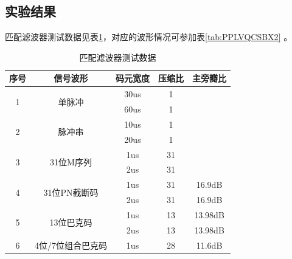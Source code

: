 \documentclass[12pt]{article}
\begin{document}
\subsection{实验结果}
匹配滤波器测试数据见表\ref{tab:addlabelPPLVQ}，对应的波形情况可参加表\ref{tab:PPLVQCSBX2}
。
\begin{table}[htbp]
  \centering
  \caption{匹配滤波器测试数据}
    \begin{tabular}{|c|c|c|c|c|}
    \hline
    序号 & 信号波形 & 码元宽度 & 压缩比 & 主旁瓣比 \\
    \hline
    \multirow{2}[4]{*}{1} & \multirow{2}[4]{*}{单脉冲} & 30us & 1 &   \\
\cline{3-5}      &   & 60us & 1 &  \\
    \hline
    \multirow{2}[4]{*}{2} & \multirow{2}[4]{*}{脉冲串} & 10us & 1 &  \\
\cline{3-5}      &   & 20us & 1 &  \\
    \hline
    \multirow{2}[4]{*}{3} & \multirow{2}[4]{*}{31位M序列} & 1us & 31 &  \\
\cline{3-5}      &   & 2us & 31 &  \\
    \hline
    \multirow{2}[4]{*}{4} & \multirow{2}[4]{*}{31位PN截断码} & 1us & 31 & 16.9dB \\
\cline{3-5}      &   & 2us & 31 & 16.9dB \\
    \hline
    \multirow{2}[4]{*}{5} & \multirow{2}[4]{*}{13位巴克码} & 1us & 13 & 13.98dB \\
\cline{3-5}      &   & 2us & 13 & 13.98dB \\
    \hline
    6 & 4位/7位组合巴克码 & 1us & 28 & 11.6dB \\
    \hline
    \end{tabular}%
  \label{tab:addlabelPPLVQ}%
\end{table}%
\end{document}
